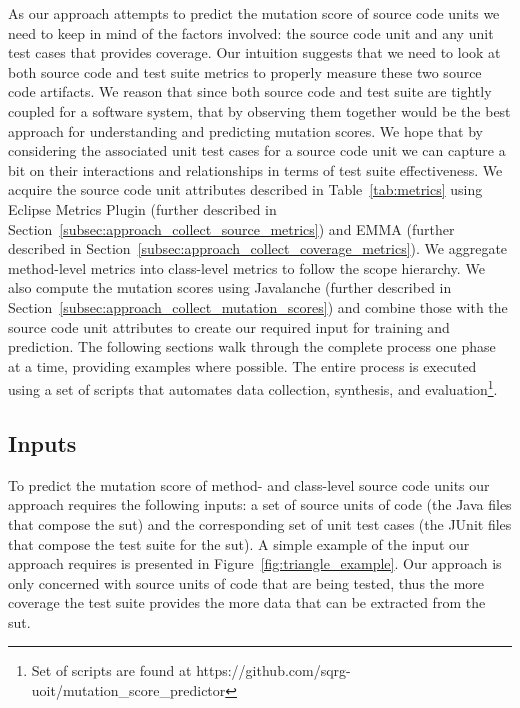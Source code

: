 As our approach attempts to predict the mutation score of source code units we need to keep in mind of the factors involved: the source code unit and any unit test cases that provides coverage. Our intuition suggests that we need to look at both source code and test suite metrics to properly measure these two source code artifacts. We reason that since both source code and test suite are tightly coupled for a software system, that by observing them together would be the best approach for understanding and predicting mutation scores. We hope that by considering the associated unit test cases for a source code unit we can capture a bit on their interactions and relationships in terms of test suite effectiveness. We acquire the source code unit attributes described in Table~\ref{tab:metrics} using Eclipse Metrics Plugin (further described in Section~\ref{subsec:approach_collect_source_metrics}) and EMMA (further described in Section~\ref{subsec:approach_collect_coverage_metrics}). We aggregate method-level metrics into class-level metrics to follow the scope hierarchy. We also compute the mutation scores using Javalanche (further described in Section~\ref{subsec:approach_collect_mutation_scores}) and combine those with the source code unit attributes to create our required input for training and prediction. The following sections walk through the complete process one phase at a time, providing examples where possible. The entire process is executed using a set of scripts that automates data collection, synthesis, and evaluation\footnote{Set of scripts are found at https://github.com/sqrg-uoit/mutation\_score\_predictor}.


\subsection{Inputs}
\label{subsec:approach_inputs}
To predict the mutation score of method- and class-level source code units our approach requires the following inputs: a set of source units of code (the Java files that compose the \gls{sut}) and the corresponding set of unit test cases (the JUnit files that compose the test suite for the \gls{sut}). A simple example of the input our approach requires is presented in Figure~\ref{fig:triangle_example}. Our approach is only concerned with source units of code that are being tested, thus the more coverage the test suite provides the more data that can be extracted from the \gls{sut}.


